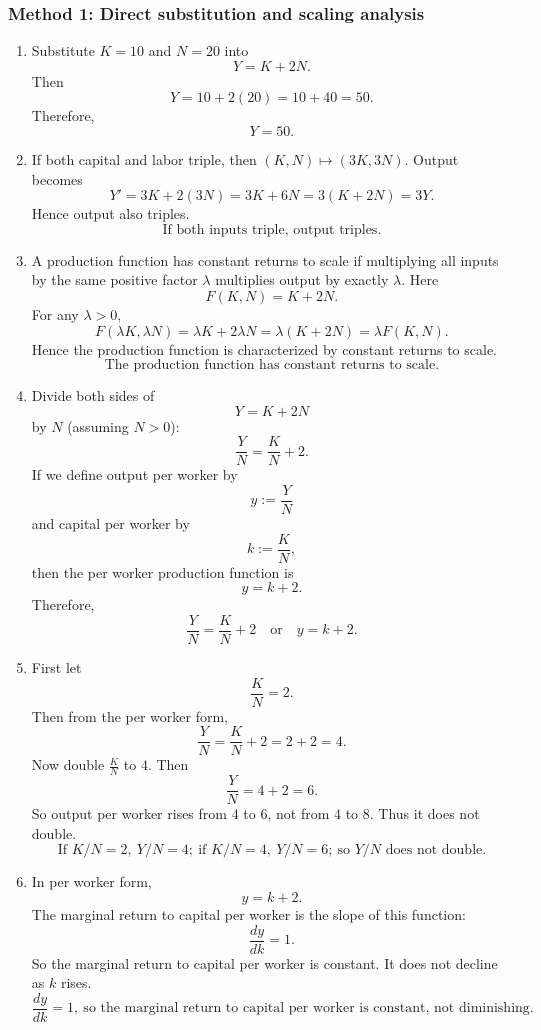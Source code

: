 \documentclass[12pt]{article}
\begin{document}
\subsubsection{Method 1: Direct substitution and scaling analysis}
\begin{enumerate}[label=(\alph*)]
    \item
    Substitute \(K=10\) and \(N=20\) into
    \[
    Y=K+2N.
    \]
    Then
    \[
    Y=10+2(20)=10+40=50.
    \]
    Therefore,
    \[
    \boxed{Y=50.}
    \]

    \item
    If both capital and labor triple, then \((K,N)\mapsto(3K,3N)\). Output becomes
    \[
    Y'=3K+2(3N)=3K+6N=3(K+2N)=3Y.
    \]
    Hence output also triples.
    \[
    \boxed{\text{If both inputs triple, output triples.}}
    \]

    \item
    A production function has constant returns to scale if multiplying all inputs by the same positive factor \(\lambda\) multiplies output by exactly \(\lambda\). Here
    \[
    F(K,N)=K+2N.
    \]
    For any \(\lambda>0\),
    \[
    F(\lambda K,\lambda N)=\lambda K+2\lambda N=\lambda(K+2N)=\lambda F(K,N).
    \]
    Hence the production function is characterized by constant returns to scale.
    \[
    \boxed{\text{The production function has constant returns to scale.}}
    \]

    \item
    Divide both sides of
    \[
    Y=K+2N
    \]
    by \(N\) (assuming \(N>0\)):
    \[
    \frac{Y}{N}=\frac{K}{N}+2.
    \]
    If we define output per worker by
    \[
    y:=\frac{Y}{N}
    \]
    and capital per worker by
    \[
    k:=\frac{K}{N},
    \]
    then the per worker production function is
    \[
    y=k+2.
    \]
    Therefore,
    \[
    \boxed{\frac{Y}{N}=\frac{K}{N}+2 \quad\text{or}\quad y=k+2.}
    \]

    \item
    First let
    \[
    \frac{K}{N}=2.
    \]
    Then from the per worker form,
    \[
    \frac{Y}{N}=\frac{K}{N}+2=2+2=4.
    \]
    Now double \(\frac{K}{N}\) to \(4\). Then
    \[
    \frac{Y}{N}=4+2=6.
    \]
    So output per worker rises from \(4\) to \(6\), not from \(4\) to \(8\). Thus it does not double.
    \[
    \boxed{\text{If }K/N=2,\ Y/N=4;\ \text{if }K/N=4,\ Y/N=6;\ \text{so }Y/N\text{ does not double.}}
    \]

    \item
    In per worker form,
    \[
    y=k+2.
    \]
    The marginal return to capital per worker is the slope of this function:
    \[
    \frac{dy}{dk}=1.
    \]
    So the marginal return to capital per worker is constant. It does not decline as \(k\) rises.
    \[
    \boxed{\frac{dy}{dk}=1,\ \text{so the marginal return to capital per worker is constant, not diminishing.}}
    \]


\end{enumerate}
\end{document}
